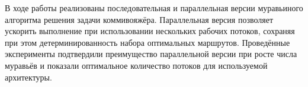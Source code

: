
В ходе работы реализованы последовательная и параллельная версии муравьиного алгоритма
решения задачи коммивояжёра. Параллельная версия позволяет ускорить выполнение при
использовании нескольких рабочих потоков, сохраняя при этом детерминированность набора
оптимальных маршрутов. Проведённые эксперименты подтвердили преимущество параллельной
версии при росте числа муравьёв и показали оптимальное количество потоков для используемой
архитектуры.

\clearpage
